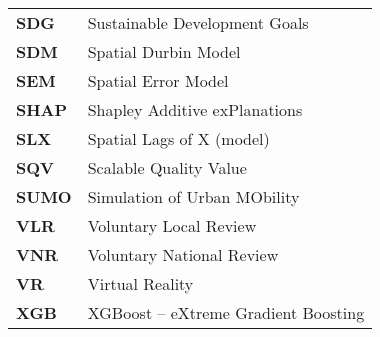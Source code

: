 \begin{tabularx}{\textwidth}{lX}
      \textbf{SDG} &  Sustainable Development Goals\\
      \textbf{SDM} &  Spatial Durbin Model\\
      \textbf{SEM} &  Spatial Error Model\\
      \textbf{SHAP} & Shapley Additive exPlanations \\
      \textbf{SLX} &  Spatial Lags of X (model)\\
      \textbf{SQV} &  Scalable Quality Value\\
      \textbf{SUMO} & Simulation of Urban MObility \\
      \textbf{VLR} & Voluntary Local Review \\
      \textbf{VNR} & Voluntary National Review \\
      \textbf{VR} & Virtual Reality \\
      \textbf{XGB} &  XGBoost -- eXtreme Gradient Boosting\\
    \end{tabularx}

\endgroup

